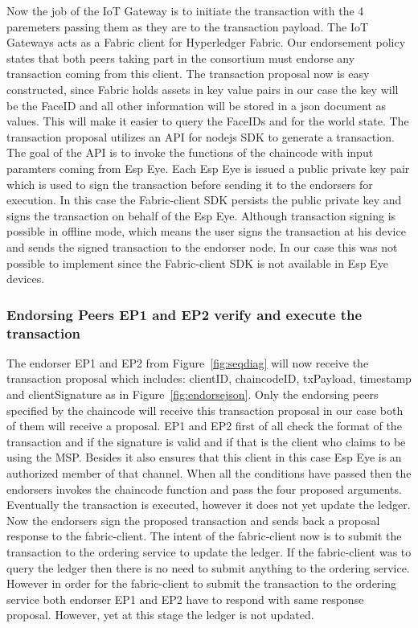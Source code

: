 Now the job of the IoT Gateway is to initiate the transaction with the 4 paremeters passing them as they are to the transaction payload. The IoT Gateways acts as a Fabric client for Hyperledger Fabric. Our endorsement policy states that both peers taking part in the consortium must endorse any transaction coming from this client. The transaction proposal now is easy constructed, since Fabric holds assets in key value pairs in our case the key will be the FaceID and all other information will be stored in a json document as values. This will make it easier to query the FaceIDs and for the world state. The transaction proposal utilizes an API for nodejs SDK to generate a transaction. The goal of the API is to invoke the functions of the chaincode with input paramters coming from Esp Eye. Each Esp Eye is issued a public private key pair which is used to sign the transaction before sending it to the endorsers for execution. In this case the Fabric-client SDK persists the public private key and signs the transaction on behalf of the Esp Eye. Although transaction signing is possible in offline mode, which means the user signs the transaction at his device and sends the signed transaction to the endorser node. In our case this was not possible to implement since the Fabric-client SDK is not available in Esp Eye devices. 

\subsubsection{Endorsing Peers EP1 and EP2 verify and execute the transaction}

The endorser EP1 and EP2 from Figure~\ref{fig:seqdiag} will now receive the transaction proposal which includes: clientID, chaincodeID, txPayload, timestamp and clientSignature as in Figure~\ref{fig:endorsejson}. Only the endorsing peers specified by the chaincode will receive this transaction proposal in our case both of them will receive a proposal. EP1 and EP2 first of all check the format of the transaction and if the signature is valid and if that is the client who claims to be using the MSP. Besides it also ensures that this client in this case Esp Eye is an authorized member of that channel. When all the conditions have passed then the endorsers invokes the chaincode function and pass the four proposed arguments. Eventually the transaction is executed, however it does not yet update the ledger. Now the endorsers sign the proposed transaction and sends back a proposal response to the fabric-client. The intent of the fabric-client now is to submit the transaction to the ordering service to update the ledger. If the fabric-client was to query the ledger then there is no need to submit anything to the ordering service. However in order for the fabric-client to submit the transaction to the ordering service both endorser EP1 and EP2 have to respond with same response proposal. However, yet at this stage the ledger is not updated. 

